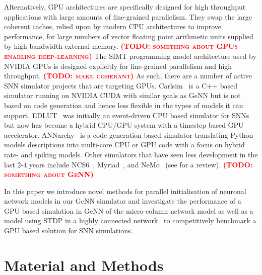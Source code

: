 \documentclass[utf8]{frontiersSCNS} %
\newcommand{\todo}[1]{\textbf{\textsc{\textcolor{red}{(TODO: #1)}}}}
\begin{document}
Alternatively, GPU architectures are specifically designed for high throughput applications with large amounts of fine-grained parallelism.
They swap the large coherent caches, relied upon by modern CPU architectures to improve performance, for large numbers of vector floating point arithmetic units supplied by high-bandwidth external memory.
\todo{something about GPUs enabling deep-learning}
The SIMT programming model architecture used by NVIDIA GPUs is designed explicitly for fine-grained parallelism and high throughput.
\todo{make coherant}
As such, there are a number of active SNN simulator projects that are targeting GPUs. Carlsim~\citep{Chou2018} is a C++ based simulator running on NVIDIA CUDA with similar goals as GeNN but is not based on code generation and hence less flexible in the types of models it can support.
EDLUT~\citep{Garrido2011} was initially an event-driven CPU based simulator for SNNs but now has become a hybrid CPU/GPU system with a timestep based GPU accelerator.
ANNarchy~\citep{Vitay2015} is a code generation based simulator translating Python models descriptions into multi-core CPU or GPU code with a focus on hybrid rate- and spiking models.
Other simulators that have seen less development in the last 2-4 years include NCS6~\citep{Hoang2013}, Myriad~\citep{Rittner2016}, and NeMo~\citep{Fidjeland2009} (see \citet{Brette2012} for a review).
\todo{something about GeNN}

In this paper we introduce novel methods for parallel initialisation of neuronal network models in our GeNN simulator and investigate the performance of a GPU based simulation in GeNN of the micro-column network model \cite{Potjans2012,VanAlbada2018} as well as a model using STDP in a highly connected network~\citep{Morrison2007} to competitively benchmark a GPU based solution for SNN simulations.

\section{Material and Methods}
\label{sec:method}
\end{document}
